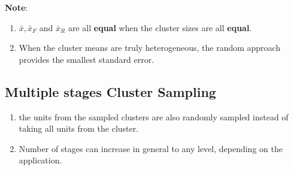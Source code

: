 \textbf{Note}:
\begin{enumerate}
    \item $\bar{x},\bar{x}_F $ and $\bar{x}_R$ are all \textbf{equal} when the cluster sizes are all \textbf{equal}.

    \item When the cluster means are truly heterogeneous, the random approach provides the smallest standard error.

\end{enumerate}


\subsection{Multiple stages Cluster Sampling \cite{ism-1}} \label{Multiple stages Cluster Sampling}

\begin{enumerate}
    \item the units from the sampled clusters are also randomly sampled instead of taking all units from the cluster.

    \item Number of stages can increase in general to any level, depending on the application.

\end{enumerate}



